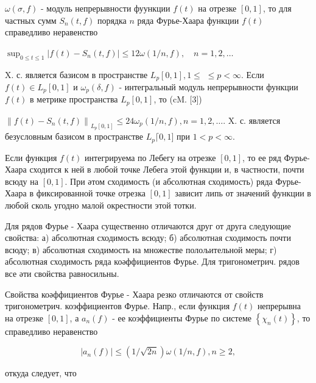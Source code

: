 \documentclass[10pt]{article}
\begin{document}
$\omega(\sigma, f)$ - модуль непрерывности фуункции $f(t)$ на отрезке $[0,1]$, то для частных сумм $S_{n}(t, f)$ порядка $n$ ряда Фурье-Хаара функции $f(t)$ справедливо неравенство



$\sup _{0 \leqslant t \leqslant 1}\left|f(t)-S_{n}(t, f)\right| \leqslant 12 \omega(1 / n, f), \quad n=1,2, \ldots$



X. с. является базисом в пространстве $L_{p}[0,1], 1 \leqslant$ $\leqslant p<\infty$. Если $f(t) \in L_{p}[0,1]$ и $\omega_{p}(\delta, f)$ - интегральный модуль непрерывности функции $f(t)$ в метрике пространства $L_{p}[0,1]$, то (cM. [3])



$\left\|f(t)-S_{n}(t, f)\right\|_{L_{p}[0,1]} \leqslant 24 \omega_{p}(1 / n, f), n=1,2, \ldots$. $\mathrm{X}$. с. является безусловным базисом в пространстве $L_{p}\lceil 0,1]$ при $1<p<\infty$.



Если функция $f(t)$ интегрируема по Лебегу на отрезке $[0,1]$, то ее ряд Фурье-Хаара сходится к ней в любой точке Лебега этой функции и, в частности, почти всюду на $[0,1]$. При әтом сходимость (и абсолютная сходимость) ряда Фурье-Хаара в фиксированной точке отрезка $[0,1]$ зависит липь от значений функции в любой сколь угодно малой окрестности этой тотки.



Для рядов Фурье - Хаара существенно отличаются друг от друга следующие свойства: а) абсолютная сходимость всюду; б) абсолютная сходимость почти всюду; в) абсолютная сходимость на множестве полољительной меры; г) абсолютная сходимость ряда коәффициентов Фурье. Для тригонометрич. рядов все әти свойства равносильны.



Свойства коәффициентов Фурье - Хаара резко отличаются от свойств тригонометрич. коэффициентов Фурье. Напр., если функция $f(t)$ непрерывна на отрезке $[0,1]$, а $a_{n}(f)$ - ее коэффициенты Фурье по системе $\left\{\chi_{n}(t)\right\}$, то справедливо неравенство



\[

\left|a_{n}(f)\right| \leqslant(1 / \sqrt{2 n}) \omega(1 / n, f), n \geqslant 2,

\]



откуда следует, что
\end{document}
